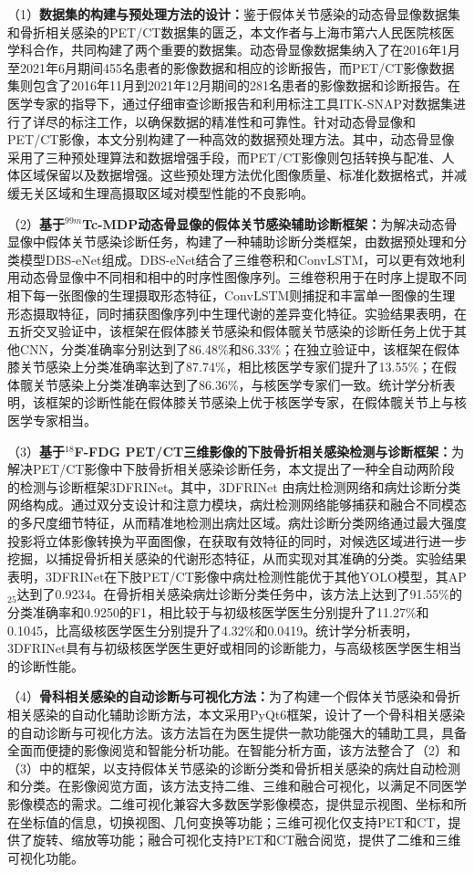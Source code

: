 （1）\textbf{数据集的构建与预处理方法的设计：}鉴于假体关节感染的动态骨显像数据集和骨折相关感染的PET/CT数据集的匮乏，本文作者与上海市第六人民医院核医学科合作，共同构建了两个重要的数据集。动态骨显像数据集纳入了在2016年1月至2021年6月期间455名患者的影像数据和相应的诊断报告，而PET/CT影像数据集则包含了2016年11月到2021年12月期间的281名患者的影像数据和诊断报告。在医学专家的指导下，通过仔细审查诊断报告和利用标注工具ITK-SNAP对数据集进行了详尽的标注工作，以确保数据的精准性和可靠性。针对动态骨显像和PET/CT影像，本文分别构建了一种高效的数据预处理方法。其中，动态骨显像采用了三种预处理算法和数据增强手段，而PET/CT影像则包括转换与配准、人体区域保留以及数据增强。这些预处理方法优化图像质量、标准化数据格式，并减缓无关区域和生理高摄取区域对模型性能的不良影响。

（2）\textbf{基于\(^{99m}\)Tc-MDP动态骨显像的假体关节感染辅助诊断框架：}为解决动态骨显像中假体关节感染诊断任务，构建了一种辅助诊断分类框架，由数据预处理和分类模型DBS-eNet组成。DBS-eNet结合了三维卷积和ConvLSTM，可以更有效地利用动态骨显像中不同相和相中的时序性图像序列。三维卷积用于在时序上提取不同相下每一张图像的生理摄取形态特征，ConvLSTM则捕捉和丰富单一图像的生理形态摄取特征，同时捕获图像序列中生理代谢的差异变化特征。实验结果表明，在五折交叉验证中，该框架在假体膝关节感染和假体髋关节感染的诊断任务上优于其他CNN，分类准确率分别达到了86.48\%和86.33\%；在独立验证中，该框架在假体膝关节感染上分类准确率达到了87.74\%，相比核医学专家们提升了13.55\%；在假体髋关节感染上分类准确率达到了86.36\%，与核医学专家们一致。统计学分析表明，该框架的诊断性能在假体膝关节感染上优于核医学专家，在假体髋关节上与核医学专家相当。

（3）\textbf{基于\(^{18}\)F-FDG PET/CT三维影像的下肢骨折相关感染检测与诊断框架：}为解决PET/CT影像中下肢骨折相关感染诊断任务，本文提出了一种全自动两阶段的检测与诊断框架3DFRINet。其中，3DFRINet 由病灶检测网络和病灶诊断分类网络构成。通过双分支设计和注意力模块，病灶检测网络能够捕获和融合不同模态的多尺度细节特征，从而精准地检测出病灶区域。病灶诊断分类网络通过最大强度投影将立体影像转换为平面图像，在获取有效特征的同时，对候选区域进行进一步挖掘，以捕捉骨折相关感染的代谢形态特征，从而实现对其准确的分类。实验结果表明，3DFRINet在下肢PET/CT影像中病灶检测性能优于其他YOLO模型，其AP\(_{25}\)达到了0.9234。在骨折相关感染病灶诊断分类任务中，该方法上达到了91.55\%的分类准确率和0.9250的F1，相比较于与初级核医学医生分别提升了11.27\%和0.1045，比高级核医学医生分别提升了4.32\%和0.0419。统计学分析表明，3DFRINet具有与初级核医学医生更好或相同的诊断能力，与高级核医学医生相当的诊断性能。

（4）\textbf{骨科相关感染的自动诊断与可视化方法：}为了构建一个假体关节感染和骨折相关感染的自动化辅助诊断方法，本文采用PyQt6框架，设计了一个骨科相关感染的自动诊断与可视化方法。该方法旨在为医生提供一款功能强大的辅助工具，具备全面而便捷的影像阅览和智能分析功能。在智能分析方面，该方法整合了（2）和（3）中的框架，以支持假体关节感染的诊断分类和骨折相关感染的病灶自动检测和分类。在影像阅览方面，该方法支持二维、三维和融合可视化，以满足不同医学影像模态的需求。二维可视化兼容大多数医学影像模态，提供显示视图、坐标和所在坐标值的信息，切换视图、几何变换等功能；三维可视化仅支持PET和CT，提供了旋转、缩放等功能；融合可视化支持PET和CT融合阅览，提供了二维和三维可视化功能。

